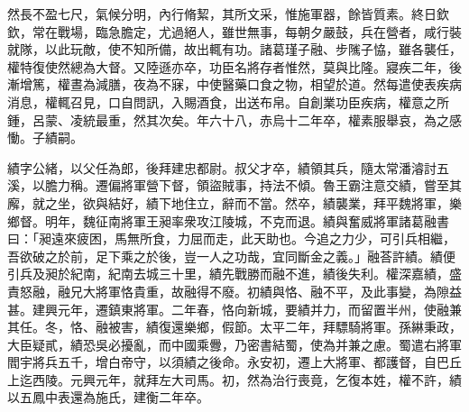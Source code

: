 \begin{pinyinscope}
然長不盈七尺，氣候分明，內行脩絜，其所文采，惟施軍器，餘皆質素。終日欽欽，常在戰場，臨急膽定，尤過絕人，雖世無事，每朝夕嚴鼓，兵在營者，咸行裝就隊，以此玩敵，使不知所備，故出輒有功。諸葛瑾子融、步隲子恊，雖各襲任，權特復使然總為大督。又陸遜亦卒，功臣名將存者惟然，莫與比隆。寢疾二年，後漸增篤，權晝為減膳，夜為不寐，中使醫藥口食之物，相望於道。然每遣使表疾病消息，權輒召見，口自問訊，入賜酒食，出送布帛。自創業功臣疾病，權意之所鍾，呂蒙、凌統最重，然其次矣。年六十八，赤烏十二年卒，權素服舉哀，為之感慟。子績嗣。

績字公緒，以父任為郎，後拜建忠都尉。叔父才卒，績領其兵，隨太常潘濬討五溪，以膽力稱。遷偏將軍營下督，領盜賊事，持法不傾。魯王霸注意交績，嘗至其廨，就之坐，欲與結好，績下地住立，辭而不當。然卒，績襲業，拜平魏將軍，樂鄉督。明年，魏征南將軍王昶率衆攻江陵城，不克而退。績與奮威將軍諸葛融書曰：「昶遠來疲困，馬無所食，力屈而走，此天助也。今追之力少，可引兵相繼，吾欲破之於前，足下乘之於後，豈一人之功哉，宜同斷金之義。」融荅許績。績便引兵及昶於紀南，紀南去城三十里，績先戰勝而融不進，績後失利。權深嘉績，盛責怒融，融兄大將軍恪貴重，故融得不廢。初績與恪、融不平，及此事變，為隙益甚。建興元年，遷鎮東將軍。二年春，恪向新城，要績并力，而留置半州，使融兼其任。冬，恪、融被害，績復還樂鄉，假節。太平二年，拜驃騎將軍。孫綝秉政，大臣疑貳，績恐吳必擾亂，而中國乘釁，乃密書結蜀，使為并兼之慮。蜀遣右將軍閻宇將兵五千，增白帝守，以須績之後命。永安初，遷上大將軍、都護督，自巴丘上迄西陵。元興元年，就拜左大司馬。初，然為治行喪竟，乞復本姓，權不許，績以五鳳中表還為施氏，建衡二年卒。


\end{pinyinscope}